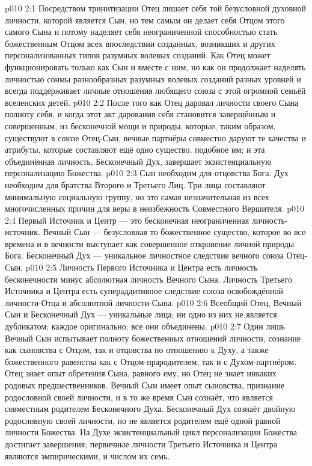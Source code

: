 \vs p010 2:1 Посредством тринитизации Отец лишает себя той безусловной духовной личности, которой является Сын, но тем самым он делает себя Отцом этого самого Сына и потому наделяет себя неограниченной способностью стать божественным Отцом всех впоследствии созданных, возникших и  других персонализованных типов разумных волевых созданий. Как  Отец может функционировать только как Сын и вместе с ним, но как  он продолжает наделять личностью сонмы разнообразных разумных волевых созданий разных уровней и всегда поддерживает личные отношения любящего союза с этой огромной семьёй вселенских детей.
\vs p010 2:2 После того как Отец даровал личности своего Сына полноту себя, и когда этот акт дарования себя становится завершённым и совершенным, из бесконечной мощи и природы, которые, таким образом, существуют в союзе Отец\hyp{}Сын, вечные партнёры совместно даруют те качества и атрибуты, которые составляют ещё одно существо, подобное им; и эта объединённая личность, Бесконечный Дух, завершает экзистенциальную персонализацию Божества.
\vs p010 2:3 Сын необходим для отцовства Бога. Дух необходим для братства Второго и Третьего Лиц. Три лица составляют минимальную социальную группу, но это самая незначительная из всех многочисленных причин для веры в неизбежность Совместного Вершителя.
\vs p010 2:4 \pc Первый Источник и Центр --- это бесконечная  неограниченная личность\hyp{}источник. Вечный Сын --- безусловная  то божественное существо, которое во все времена и в вечности выступает как совершенное откровение личной природы Бога. Бесконечный Дух ---  уникальное личностное следствие вечного союза Отец\hyp{}Сын.
\vs p010 2:5 \pc Личность Первого Источника и Центра есть личность бесконечности минус абсолютная личность Вечного Сына. Личность Третьего Источника и Центра есть супераддитивное следствие союза освобождённой личности\hyp{}Отца и абсолютной личности\hyp{}Сына.
\vs p010 2:6 \pc Всеобщий Отец, Вечный Сын и Бесконечный Дух --- уникальные лица; ни одно из них не является дубликатом; каждое оригинально; все они объединены.
\vs p010 2:7 \pc Один лишь Вечный Сын испытывает полноту божественных отношений личности, сознание как сыновства с Отцом, так и отцовства по отношению к Духу, а также божественного равенства как с Отцом\hyp{}прародителем, так и с Духом\hyp{}партнёром. Отец знает опыт обретения Сына, равного ему, но Отец не знает никаких родовых предшественников. Вечный Сын имеет опыт сыновства, признание родословной своей личности, и в то же время Сын сознаёт, что является совместным родителем Бесконечного Духа. Бесконечный Дух сознаёт двойную родословную своей личности, но не является родителем ещё одной равной личности Божества. На Духе экзистенциальный цикл персонализации Божества достигает завершения; первичные личности Третьего Источника и Центра являются эмпирическими, и числом их семь.
